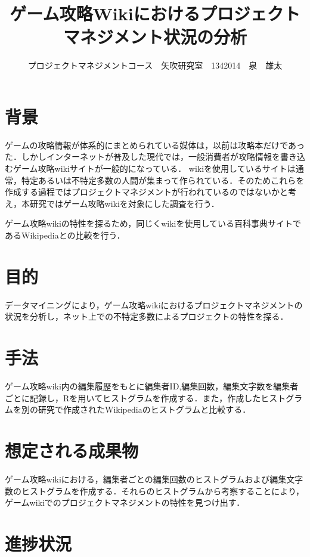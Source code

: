 \documentclass[uplatex,twocolumn,dvipdfmx]{jsarticle}
\title{\vspace{-5mm}\fontsize{14pt}{0pt}\selectfont  ゲーム攻略Wikiにおけるプロジェクトマネジメント状況の分析}
\author{\normalsize プロジェクトマネジメントコース　矢吹研究室　1342014　泉　雄太}
\date{}
\begin{document}
\fontsize{10.5pt}{\baselineskip}\selectfont
\maketitle





\section{背景}

ゲームの攻略情報が体系的にまとめられている媒体は，以前は攻略本だけであった．しかしインターネットが普及した現代では，一般消費者が攻略情報を書き込むゲーム攻略wikiサイトが一般的になっている．
wikiを使用しているサイトは通常，特定あるいは不特定多数の人間が集まって作られている．そのためこれらを作成する過程ではプロジェクトマネジメントが行われているのではないかと考え，本研究ではゲーム攻略wikiを対象にした調査を行う．

ゲーム攻略wikiの特性を探るため，同じくwikiを使用している百科事典サイトであるWikipediaとの比較を行う．



\section{目的}

データマイニングにより，ゲーム攻略wikiにおけるプロジェクトマネジメントの状況を分析し，ネット上での不特定多数によるプロジェクトの特性を探る．

\section{手法}

ゲーム攻略wiki内の編集履歴をもとに編集者ID,編集回数，編集文字数を編集者ごとに記録し，Rを用いてヒストグラムを作成する．また，作成したヒストグラムを別の研究で作成されたWikipediaのヒストグラムと比較する．

\section{想定される成果物}

ゲーム攻略wikiにおける，編集者ごとの編集回数のヒストグラムおよび編集文字数のヒストグラムを作成する．それらのヒストグラムから考察することにより，ゲームwikiでのプロジェクトマネジメントの特性を見つけ出す．

\section{進捗状況}
\end{document}
